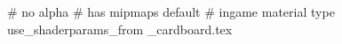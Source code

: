 # no alpha
# has mipmaps
default			 # ingame material type
use_shaderparams_from
_cardboard.tex





